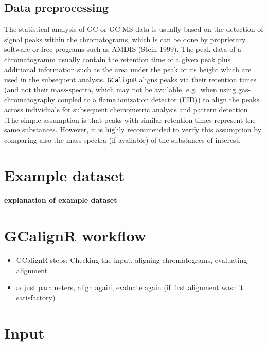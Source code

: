 \documentclass[]{article}
\providecommand{\tightlist}{%
  \setlength{\itemsep}{0pt}\setlength{\parskip}{0pt}}
\let\oldparagraph\paragraph
\renewcommand{\paragraph}[1]{\oldparagraph{#1}\mbox{}}
\begin{document}
\subsection{Data preprocessing}\label{data-preprocessing}

The statistical analysis of GC or GC-MS data is usually based on the
detection of signal peaks within the chromatograms, which is can be done
by proprietary software or free programs such as AMDIS (Stein 1999). The
peak data of a chromatogramm usually contain the retention time of a
given peak plus additional information such as the area under the peak
or its height which are used in the subsequent analysis.
\texttt{GCalignR} aligns peaks via their retention times (and not their
mass-spectra, which may not be available, e.g.~when using
gas-chromatography coupled to a flame ionization detector (FID)) to
align the peaks across individuals for subsequent chemometric analysis
and pattern detection .The simple assumption is that peaks with similar
retention times represent the same substances. However, it is highly
recommended to verify this assumption by comparing also the mass-spectra
(if available) of the substances of interest.

\section{Example dataset}\label{example-dataset}

\paragraph{explanation of example
dataset}\label{explanation-of-example-dataset}

\section{GCalignR workflow}\label{gcalignr-workflow}

\begin{itemize}
\tightlist
\item
  GCalignR steps: Checking the input, aligning chromatograms, evaluating
  alignment
\item
  adjust parameters, align again, evaluate again (if first alignment
  wasn´t satisfactory)
\end{itemize}

\section{Input}\label{input}
\end{document}
